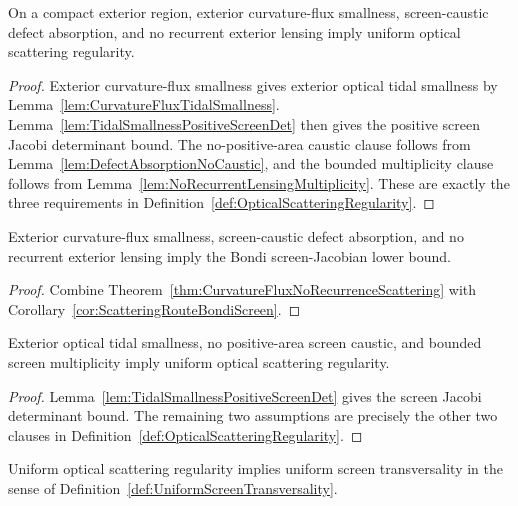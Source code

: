 \begin{theorem}\label{thm:CurvatureFluxNoRecurrenceScattering}
On a compact exterior region, exterior curvature-flux smallness, screen-caustic defect absorption, and no recurrent exterior lensing imply uniform optical scattering regularity.
\end{theorem}

\begin{proof}
Exterior curvature-flux smallness gives exterior optical tidal smallness by Lemma~\ref{lem:CurvatureFluxTidalSmallness}. Lemma~\ref{lem:TidalSmallnessPositiveScreenDet} then gives the positive screen Jacobi determinant bound. The no-positive-area caustic clause follows from Lemma~\ref{lem:DefectAbsorptionNoCaustic}, and the bounded multiplicity clause follows from Lemma~\ref{lem:NoRecurrentLensingMultiplicity}. These are exactly the three requirements in Definition~\ref{def:OpticalScatteringRegularity}.
\end{proof}

\begin{corollary}\label{cor:CurvatureFluxBondiScreenEstimate}
Exterior curvature-flux smallness, screen-caustic defect absorption, and no recurrent exterior lensing imply the Bondi screen-Jacobian lower bound.
\end{corollary}

\begin{proof}
Combine Theorem~\ref{thm:CurvatureFluxNoRecurrenceScattering} with Corollary~\ref{cor:ScatteringRouteBondiScreen}.
\end{proof}

\begin{corollary}\label{cor:TidalRouteScatteringRegularity}
Exterior optical tidal smallness, no positive-area screen caustic, and bounded screen multiplicity imply uniform optical scattering regularity.
\end{corollary}

\begin{proof}
Lemma~\ref{lem:TidalSmallnessPositiveScreenDet} gives the screen Jacobi determinant bound. The remaining two assumptions are precisely the other two clauses in Definition~\ref{def:OpticalScatteringRegularity}.
\end{proof}

\begin{lemma}\label{lem:ScatteringRegularityScreenTransversality}
Uniform optical scattering regularity implies uniform screen transversality in the sense of Definition~\ref{def:UniformScreenTransversality}.
\end{lemma}

